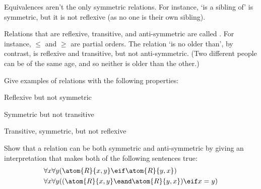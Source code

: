Equivalences aren't the only symmetric relations. For instance, `is a
sibling of' is symmetric, but it is not reflexive (as no one is their own
sibling).

Relations that are reflexive, transitive, and anti-symmetric are
called . For instance, $\le$ and $\ge$ are
partial orders. The relation `is no older than', by contrast, is
reflexive and transitive, but not anti-symmetric. (Two different
people can be of the same age, and so neither is older than the
other.)

\practiceproblems

\problempart
Give examples of relations with the following properties:
\begin{compactlist}
	\item Reflexive but not symmetric
	\item Symmetric but not transitive
	\item Transitive, symmetric, but not reflexive
\end{compactlist}

\problempart
Show that a relation can be both symmetric and anti-symmetric by
giving an interpretation that makes both of the following sentences
true:
\begin{align*}
	& \forall x\forall y(\atom{R}{x,y} \eif \atom{R}{y,x})\\
	& \forall x\forall y((\atom{R}{x,y} \eand \atom{R}{y,x}) \eif x=y)
\end{align*}

